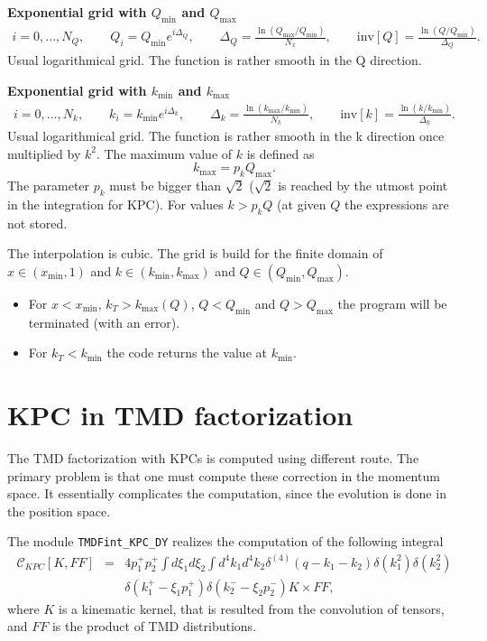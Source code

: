 \documentclass[prd,nofootinbib,eqsecnum,final]{revtex4}
\renewcommand{\(}{\left(}
\renewcommand{\)}{\right)}
\renewcommand{\[}{\left[}
\renewcommand{\]}{\right]}
\begin{document}
\textbf{Exponential grid with $Q_{\text{min}}$ and $Q_{\text{max}}$} 
\begin{eqnarray}\label{grid_KT:Q-grid}
i=0,...,N_Q,\qquad 
Q_i=Q_{\text{min}}e^{i\Delta_Q},\qquad \Delta_Q=\frac{\ln(Q_{\text{max}}/Q_{\text{min}})}{N_x},\qquad \text{inv}[Q]=
\frac{\ln(Q/Q_{\text{min}})}{\Delta_Q}.
\end{eqnarray}
Usual logarithmical grid. The function is rather smooth in the Q direction.

\textbf{Exponential grid with $k_{\text{min}}$ and $k_{\text{max}}$} 
\begin{eqnarray}\label{grid_KT:Q-grid}
i=0,...,N_k,\qquad 
k_i=k_{\text{min}}e^{i\Delta_k},\qquad \Delta_k=\frac{\ln(k_{\text{max}}/k_{\text{min}})}{N_k},\qquad \text{inv}[k]=
\frac{\ln(k/k_{\text{min}})}{\Delta_k}.
\end{eqnarray}
Usual logarithmical grid. The function is rather smooth in the k direction once multiplied by $k^2$. The maximum value of $k$ is defined as 
$$k_{\text{max}}=p_k Q_{\text{max}}.$$ 
The parameter $p_k$ must be bigger than $\sqrt{2}$ ($\sqrt{2}$ is reached by the utmost point in the integration for KPC). For values $k>p_kQ$ (at given $Q$ the expressions are not stored.

The interpolation is cubic. The grid is build for the finite domain of $x\in(x_{\min},1)$ and $k\in(k_{\text{min}},k_{\text{max}})$ and $Q\in(Q_{\text{min}},Q_{\text{max}})$. 
\begin{itemize}
\item For $x<x_{\min}$, $k_T>k_{\max}(Q)$, $Q<Q_{\text{min}}$ and $Q>Q_{\text{max}}$ the program will be terminated (with an error). 
\item For $k_T<k_{\min}$ the code returns the value at $k_{\min}$. 
\end{itemize}

\newpage

\section{KPC in TMD factorization}

The TMD factorization with KPCs is computed using different route. The primary problem is that one must compute these correction in the momentum space. It essentially complicates the computation, since the evolution is done in the position space. 

The module \texttt{TMDFint\_KPC\_DY} realizes the computation of the following integral
\begin{eqnarray}\label{KPC:main}
\mathcal{C}_{KPC}[K,FF]&=&4p_1^+p_2^+\int d\xi_1 d\xi_2 \int d^4k_1 d^4k_2 \delta^{(4)}(q-k_1-k_2)\delta(k_1^2)\delta(k_2^2)
\\ &&\delta(k_1^+-\xi_1 p_1^+)\delta(k_2^--\xi_2 p_2^-)K \times FF,
\end{eqnarray}
where $K$ is a kinematic kernel, that is resulted from the convolution of tensors, and $FF$ is the product of TMD distributions.
\end{document}
